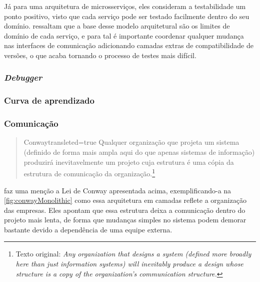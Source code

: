Já para uma arquitetura de microsserviços, eles consideram a testabilidade um ponto positivo, visto que
cada serviço pode ser testado facilmente dentro do seu domínio. 
ressaltam que a base desse modelo arquitetural são os limites de domínio de cada serviço, e
para tal é importante coordenar qualquer mudança nas interfaces de comunicação adicionando camadas
extras de compatibilidade de versões, o que acaba tornando o processo de testes mais difícil.

\subsubsection{\textit{Debugger}}
\subsubsection{Curva de aprendizado}
\subsubsection{Comunicação}

\begin{quotation}{Conway}{transleted=true}
    Qualquer organização que projeta um sistema (definido de forma mais ampla aqui do que apenas sistemas de informação)
    produzirá inevitavelmente um projeto cuja estrutura é uma cópia da estrutura de comunicação da
    organização.\footnote{Texto original: \textit{Any organization that designs a system (defined more broadly
    here than just information systems) will inevitably produce a design whose structure is a copy
    of the organization's communication structure.}}
\end{quotation}

 faz uma menção a Lei de Conway apresentada acima,
exemplificando-a na \autoref{fig:conwayMonolithic} como essa arquitetura em camadas reflete a
organização das empresas. Eles apontam que essa estrutura deixa a comunicação dentro do projeto mais
lenta, de forma que mudanças simples no sistema podem demorar bastante devido a dependência de uma
equipe externa.

